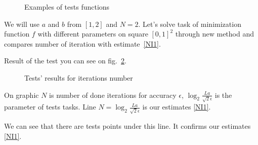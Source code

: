 \documentclass[12pt]{article}
\begin{document}
\begin{figure}[H]
\caption{Examples of tests functions}
\label{fig:examples}
\end{figure}

We will use $a$ and $b$ from $[1, 2]$ and $N = 2$. Let's solve task of minimization function $f$ with different parameters on square $[0,1]^2$ through new method and compares number of iteration with estimate~\eqref{NI1}.

Result of the test you can see on fig.~\ref{fig:image}.

\begin{figure}[h!]
\caption{Tests' results for iterations number}
\label{fig:image}
\end{figure}

On graphic $N$ is number of done iterations for accuracy $\epsilon$, $\log_2\frac{La}{\sqrt{2}\epsilon}$ is the parameter of tests tasks. Line $N = \log_2\frac{La}{\sqrt{2}\epsilon}$ is our estimates \eqref{NI1}.

We can see that there are tests points under this line. It confirms our estimates \eqref{NI1}.
\end{document}
